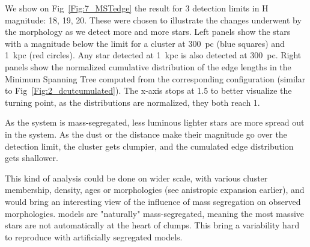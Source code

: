 We show on Fig~\ref{Fig:7_MSTedge} the result for 3 detection limits in H magnitude: 18, 19, 20. These were chosen to illustrate the changes underwent by the morphology as we detect more and more stars. Left panels show the stars with a magnitude below the limit for a cluster at 300~pc (blue squares) and 1~kpc (red circles). Any star detected at 1~kpc is also detected at 300~pc. Right panels show the normalized cumulative distribution of the edge lengths in the Minimum Spanning Tree computed from the corresponding configuration (similar to Fig~\ref{Fig:2_dcutcumulated}). The x-axis stops at 1.5 to better visualize the turning point, as the distributions are normalized, they both reach 1.



As the system is mass-segregated, less luminous lighter stars are more spread out in the system. As the dust or the distance make their magnitude go over the detection limit, the cluster gets clumpier, and the cumulated edge distribution gets shallower. 

This kind of analysis could be done on wider scale, with various cluster membership, density, ages or morphologies (see anistropic expansion earlier), and would bring an interesting view of the influence of mass segregation on observed morphologies. \HubLem models are "naturally" mass-segregated, meaning the most massive stars are not automatically at the heart of clumps. This bring a variability hard to reproduce with artificially segregated models. 



